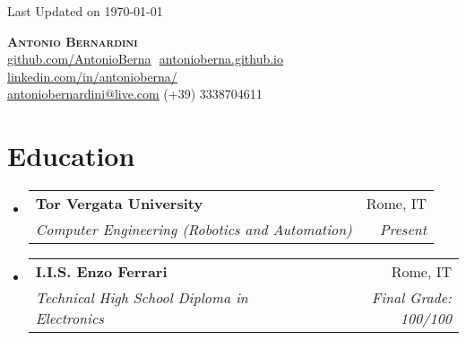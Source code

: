 \documentclass[letterpaper,11pt]{article}
\makeatletter
\newcommand{\resumeSubheading}[4]{
  \vspace{-2pt}\item
    \begin{tabular*}{0.97\textwidth}[t]{l@{\extracolsep{\fill}}r}
      \textbf{#1} & #2 \\
      \textit{\small#3} & \textit{\small #4} \\
    \end{tabular*}\vspace{-7pt}
}
\newcommand{\resumeProjectHeading}[2]{
    \item
    \begin{tabular*}{0.97\textwidth}{l@{\extracolsep{\fill}}r}
      \small#1 & #2 \\
    \end{tabular*}\vspace{-7pt}
}
\newcommand{\resumeSubHeadingListStart}{\begin{itemize}[leftmargin=0.15in, label={}]}
\newcommand{\resumeSubHeadingListEnd}{\end{itemize}}
\makeatother
\begin{document}
\begin{flushright}
  \color{gray}
  \item
  Last Updated on \today
\end{flushright}

\vspace{-5pt}

\begin{center}
    \textbf{\Huge \scshape Antonio Bernardini} \\ \vspace{8pt}
    \small
    \href{https://github.com/AntonioBerna}{\underline{github.com/AntonioBerna}} $  $
    \href{https://antonioberna.github.io}
    {\underline{antonioberna.github.io}} $  $
    \href{https://www.linkedin.com/in/antonioberna/}{\underline{linkedin.com/in/antonioberna/}} $  $ \\
    \href{mailto:antoniobernardini@live.com}
    {\underline{antoniobernardini@live.com}}
     (+39) 3338704611
\end{center}

\section{Education}
  \resumeSubHeadingListStart
  
    \resumeSubheading
      {Tor Vergata University}{Rome, IT}
      {Computer Engineering (Robotics and Automation)}{Present}
    \resumeSubheading
      {I.I.S. Enzo Ferrari}{Rome, IT}
      {Technical High School Diploma in Electronics}{Final Grade: 100/100}      
  \resumeSubHeadingListEnd


\end{document}
